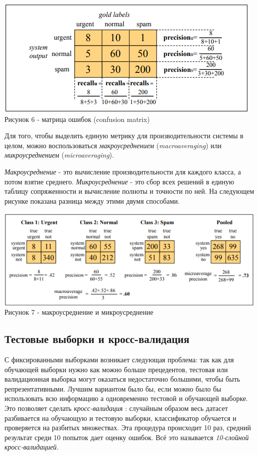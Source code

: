 \documentclass[a4paper,12pt,preview]{report} %
\begin{document}
	 \begin{center}
	 	\includegraphics[scale=0.9]{confmatrix.PNG}
	 	\\Рисунок 6 - матрица ошибок (confusion matrix)
	 \end{center}
	
	Для того, чтобы выделить единую метрику для производительности системы в целом, можно воспользоваться \textit{макроусреднением} (\textit{macroaveraging}) или \textit{микроусреднением} (\textit{microaveraging}).
	
	\textit{Макроусреднение} - это вычисление производительности для каждого класса, а потом взятие среднего.
	\textit{Микроусреднение} - это сбор всех решений в единую таблицу сопряженности и вычисление полноты и точности по ней. На следующем рисунке показана разница между этими двумя способами. 
	
	\begin{center}
		\includegraphics[scale=0.9]{micromacro.PNG}
		\\Рисунок 7 - макроусреднение и микроусреднение
	\end{center}
	
	
	\subsection{Тестовые выборки и кросс-валидация}
	С фиксированными выборками возникает следующая проблема: так как для обучающей выборки нужно как можно больше прецедентов, тестовая или валидационная выборка могут оказаться недостаточно большими, чтобы быть репрезентативными. Лучшим вариантом было бы, если можно было бы использовать всю информацию а одновременно тестовой и обучающей выборке. Это позволяет сделать \textit{кросс-валидация} \cite{15} :
	случайным образом весь датасет разбивается на обучающую и тестовую выборки, классификатор обучается и проверяется на разбитых множествах. 
	Эта процедура происходит 10 раз, средний результат среди 10 попыток дает оценку ошибок. Всё это называется \textit{10-слойной кросс-валидацией}.
		
\end{document}
